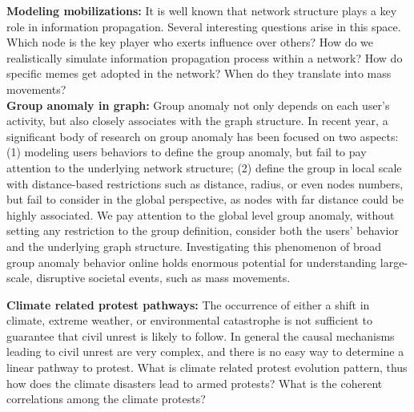 \noindent
{\bf Modeling mobilizations:}
It is well known that network structure plays a key role in information propagation.
Several interesting questions arise in this space. Which node is the key player who exerts influence over others? How do we realistically simulate information propagation process within a network?
How do specific memes get adopted in the network? When do they translate into mass movements?\\

\noindent
{\bf Group anomaly in graph:}
Group anomaly not only depends on each user's activity, but also closely associates with the graph structure. In recent year, a significant body of research on group anomaly has been focused on two aspects: (1) modeling users behaviors to define the group anomaly, but fail to pay attention to the underlying network structure; (2) define the group in local scale with distance-based restrictions such as distance, radius, or even nodes numbers, but fail to consider in the global perspective, as nodes with far distance could be highly associated. We pay attention to the global level group anomaly,  without setting any restriction to the group definition, consider both the users' behavior and the underlying graph structure. Investigating this phenomenon of broad group anomaly behavior online holds enormous potential for understanding large-scale, disruptive societal events, such as mass movements.


\noindent
{\bf Climate related protest pathways:}
The occurrence of either a shift in climate, extreme weather, or environmental catastrophe is not sufficient to guarantee that civil unrest is likely to follow. In general the causal mechanisms leading to civil unrest are very complex, and there is no easy way to determine a linear pathway to
protest. What is climate related protest evolution pattern, thus how does the climate disasters lead to armed protests? What is the coherent correlations among the climate protests?


